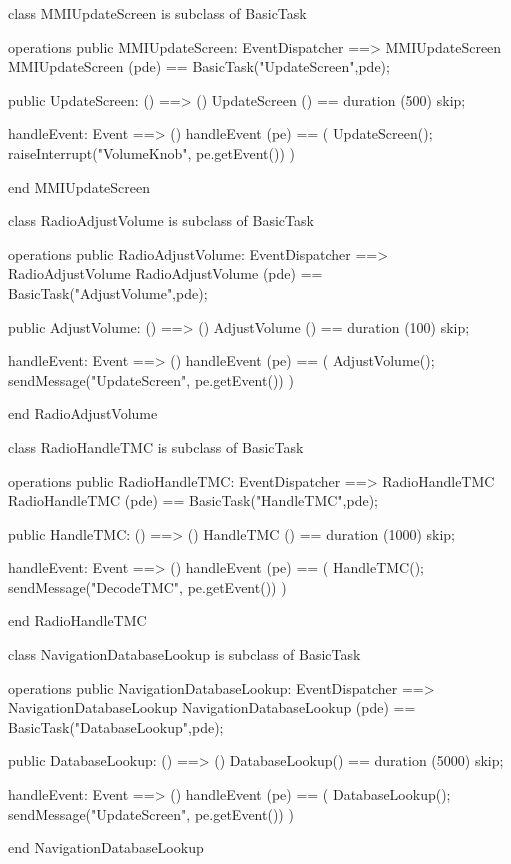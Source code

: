 \begin{vdm_al}
class MMIUpdateScreen
  is subclass of BasicTask

operations
  public MMIUpdateScreen: EventDispatcher ==> MMIUpdateScreen
  MMIUpdateScreen (pde) == BasicTask("UpdateScreen",pde);

  public UpdateScreen: () ==> ()
  UpdateScreen () == duration (500) skip;

  handleEvent: Event ==> ()
  handleEvent (pe) ==
    ( UpdateScreen();
      raiseInterrupt("VolumeKnob", pe.getEvent()) )

end MMIUpdateScreen
\end{vdm_al}

\begin{vdm_al}
class RadioAdjustVolume
  is subclass of BasicTask

operations
  public RadioAdjustVolume: EventDispatcher ==> RadioAdjustVolume
  RadioAdjustVolume (pde) == BasicTask("AdjustVolume",pde);

  public AdjustVolume: () ==> ()
  AdjustVolume () == duration (100) skip;

  handleEvent: Event ==> ()
  handleEvent (pe) ==
    ( AdjustVolume();
      sendMessage("UpdateScreen", pe.getEvent()) )

end RadioAdjustVolume
\end{vdm_al}

\begin{vdm_al}
class RadioHandleTMC
  is subclass of BasicTask

operations
  public RadioHandleTMC: EventDispatcher ==> RadioHandleTMC
  RadioHandleTMC (pde) == BasicTask("HandleTMC",pde);

  public HandleTMC: () ==> ()
  HandleTMC () == duration (1000) skip;

  handleEvent: Event ==> ()
  handleEvent (pe) ==
    ( HandleTMC();
      sendMessage("DecodeTMC", pe.getEvent()) )

end RadioHandleTMC
\end{vdm_al}

\begin{vdm_al}
class NavigationDatabaseLookup
  is subclass of BasicTask

operations
  public NavigationDatabaseLookup: EventDispatcher ==> NavigationDatabaseLookup
  NavigationDatabaseLookup (pde) == BasicTask("DatabaseLookup",pde);

  public DatabaseLookup: () ==> ()
  DatabaseLookup() == duration (5000) skip;

  handleEvent: Event ==> ()
  handleEvent (pe) ==
    ( DatabaseLookup();
      sendMessage("UpdateScreen", pe.getEvent()) )

end NavigationDatabaseLookup
\end{vdm_al}

